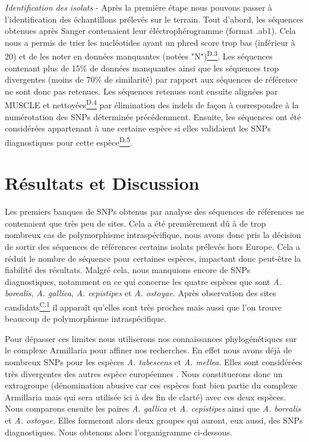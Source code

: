 \textit{Identification des isolats} - Après la première étape nous pouvons passer à l'identification des échantillons prélevés sur le terrain. Tout d'abord, les séquences obtenues après Sanger contenaient leur éléctrophérogramme (format .ab1). Cela nous a permis de trier les nucléotides ayant un phred score trop bas (inférieur à 20) et de les noter en données manquantes (notées "N")\hyperref[ann:annexeD3]{\textsuperscript{D.3}}. Les séquences contenant plus de 15\% de données manquantes ainsi que les séquences trop divergentes (moins de 70\% de similarité) par rapport aux séquences de référence ne sont donc pas retenues. Les séquences retenues sont ensuite alignées par MUSCLE et nettoyées\hyperref[ann:annexeD4]{\textsuperscript{D.4}} par élimination des indels de façon à correspondre à la numérotation des SNPs déterminée précédemment. Ensuite, les séquences ont été considérées appartenant à une certaine espèce si elles validaient les SNPs diagnostiques pour cette espèce\hyperref[ann:annexeD5]{\textsuperscript{D.5}}. 

\section{Résultats et Discussion}

Les premiers banques de SNPs obtenus par analyse des séquences de références ne contenaient que très peu de sites. Cela a été premièrement dû à de trop nombreux cas de polymorphisme intraspécifique, nous avons donc pris la décision de sortir des séquences de références certains isolats prélevés hors Europe. Cela a réduit le nombre de séquence pour certaines espèces, impactant donc peut-être la fiabilité des résultats. Malgré cela, nous manquions encore de SNPs diagnostiques, notamment en ce qui concerne les quatre espèces que sont \textit{A. borealis}, \textit{A. gallica}, \textit{A. cepistipes} et \textit{A. ostoyae}. Après observation des sites candidats\hyperref[ann:annexeC1]{\textsuperscript{C.1}} il apparaît qu'elles sont très proches mais aussi que l'on trouve beaucoup de polymorphisme intraspécifique.

Pour dépasser ces limites nous utiliserons nos connaissances phylogénétiques sur le complexe Armillaria pour affiner nos recherches. En effet nous avons déjà de nombreux SNPs pour les espèces \textit{A. tabescens} et \textit{A. mellea}. Elles sont considérées très divergentes des autres espèce européennes \cite{Tsykun2013}. Nous constituerons donc un extragroupe (dénomination abusive car ces espèces font bien partie du complexe Armillaria mais qui sera utilisée ici à des fin de clarté) avec ces deux espèces. Nous comparons ensuite les paires \textit{A. gallica} et \textit{A. cepistipes} ainsi que \textit{A. borealis} et \textit{A. ostoyae}. Elles formeront alors deux groupes qui auront, eux aussi, des SNPs diagnostiques. Nous obtenons alors l'organigramme ci-dessous.

